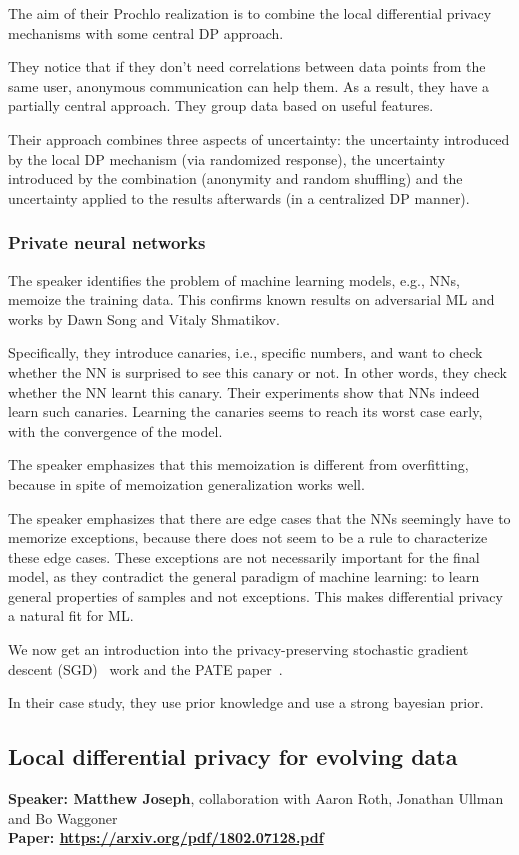 \documentclass{article}
\begin{document}
The aim of their Prochlo realization is to combine the local differential privacy mechanisms with some central DP approach.

They notice that if they don’t need correlations between data points from the same user, anonymous communication can help them. As a result, they have a partially central approach. They group data based on useful features.

Their approach combines three aspects of uncertainty: the uncertainty introduced by the local DP mechanism (via randomized response), the uncertainty introduced by the combination (anonymity and random shuffling) and the uncertainty applied to the results afterwards (in a centralized DP manner). 

\subsubsection{Private neural networks}
The speaker identifies the problem of machine learning models, e.g., NNs, memoize the training data. This confirms known results on adversarial ML and works by Dawn Song and Vitaly Shmatikov.

Specifically, they introduce canaries, i.e., specific numbers, and want to check whether the NN is surprised to see this canary or not. In other words, they check whether the NN learnt this canary. Their experiments show that NNs indeed learn such canaries. Learning the canaries seems to reach its worst case early, with the convergence of the model.

The speaker emphasizes that this memoization is different from overfitting, because in spite of memoization generalization works well.

The speaker emphasizes that there are edge cases that the NNs seemingly have to memorize exceptions, because there does not seem to be a rule to characterize these edge cases. These exceptions are not necessarily important for the final model, as they contradict the general paradigm of machine learning: to learn general properties of samples and not exceptions. This makes differential privacy a natural fit for ML.

We now get an introduction into the privacy-preserving stochastic gradient descent (SGD)~\cite{abadiSGD} work and the PATE paper~\cite{PATE}.

In their case study, they use prior knowledge and use a strong bayesian prior.



\subsection{Local differential privacy for evolving data}
\noindent\textbf{Speaker: Matthew Joseph}, collaboration with Aaron Roth, Jonathan Ullman and Bo Waggoner\\
\noindent\textbf{Paper: \url{https://arxiv.org/pdf/1802.07128.pdf}}
\end{document}
